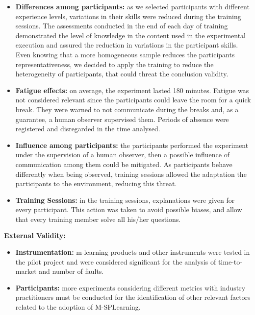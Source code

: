 \begin{itemize}
\setlength\itemsep{0.8em}
\item \textbf{Differences among participants:} as we selected participants with different experience levels, variations in their skills were reduced during the training sessions. The assessments conducted in the end of each day of training demonstrated the level of knowledge in the content used in the experimental execution and assured the reduction in variations in the participant skills. Even knowing that a more homogeneous sample reduces the participants representativeness, we decided to apply the training to reduce the heterogeneity of participants, that could threat the conclusion validity.

\item \textbf{Fatigue effects:} on average, the experiment lasted 180 minutes. Fatigue was not considered relevant since the participants could leave the room for a quick break. They were warned to not communicate during the breaks and, as a guarantee, a human observer supervised them. Periods of absence were registered and disregarded in the time analysed.

\item \textbf{Influence among participants:} the participants performed the experiment under the supervision of a human observer, then a possible influence of communication among them could be mitigated. As participants behave differently when being observed, training sessions allowed the adaptation the participants to the environment, reducing this threat.

\item \textbf{Training Sessions:} in the training sessions, explanations were given for every participant. This action was taken to avoid possible biases, and allow that every training member solve all his/her questions.
\end{itemize}

\vspace{1em}
\textbf{External Validity:}

\begin{itemize}
\setlength\itemsep{0.8em}

\item \textbf{Instrumentation:} m-learning products and other instruments were tested in the pilot project and were considered significant for the analysis of time-to-market and number of faults.

\item \textbf{Participants:} more experiments considering different metrics with industry practitioners must be conducted for the identification of other relevant factors related to the adoption of M-SPLear\allowbreak ning.

\end{itemize}

